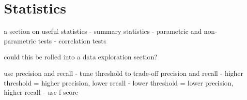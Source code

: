 

\section{Statistics} 
\label{advanced:statistics}

a section on useful statistics
- summary statistics
- parametric and non-parametric tests
- correlation tests



could this be rolled into a data exploration section?



use precision and recall
- tune threshold to trade-off precision and recall
	- higher threshold = higher precision, lower recall
	- lower threshold = lower precision, higher recall
- use f score